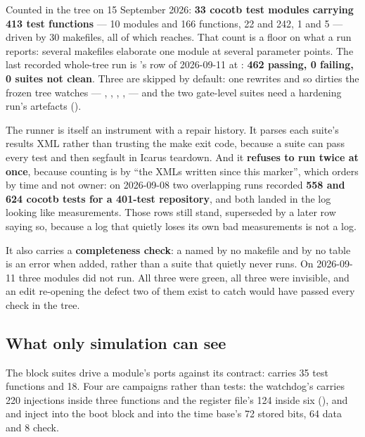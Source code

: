 Counted in the tree on 15 September 2026: \textbf{33 cocotb test modules
carrying 413 test functions} ---  10 modules and 166
functions,  22 and 242,  1 and 5
--- driven by 30 makefiles, all of which 
reaches. That count is a floor on what a run reports: several makefiles elaborate one module at several parameter points. The
last recorded whole-tree run is 's row of
2026-09-11 at : \textbf{462 passing, 0 failing, 0 suites
not clean}. Three are skipped by default: one rewrites  and so dirties the frozen tree  watches --- , , , ,  --- and the two gate-level suites need a hardening run's artefacts ().

The runner is itself an instrument with a repair history. It parses each suite's results XML rather than trusting the make exit code, because a suite can pass every test and then segfault in Icarus teardown. And it \textbf{refuses to run twice at once}, because counting is by ``the XMLs written since this marker'', which orders by time and not owner: on 2026-09-08 two overlapping runs recorded \textbf{558 and
624 cocotb tests for a 401-test repository}, and both landed in the log
looking like measurements. Those rows still stand, superseded by a later row saying so, because a log that quietly loses its own bad measurements is not a log.

It also carries a \textbf{completeness check}: a  named by no makefile and by no table is an error when added, rather than a suite that quietly never runs. On 2026-09-11 three modules did not run. All three were green, all three were invisible, and an edit re-opening the defect two of them exist to catch would have passed every check in the tree.

\subsection{What only simulation can see}

The block suites drive a module's ports against its contract:
 carries 35 test functions and  18. Four are campaigns rather than tests:
the watchdog's carries 220 injections inside three functions and the
register file's 124 inside six (), and
 and 
inject into the boot block and into the time base's 72 stored bits, 64 data and 8 check.

